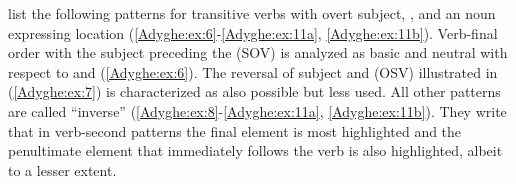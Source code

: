 \documentclass[output=paper,colorlinks,citecolor=brown, draft]{langscibook}
\begin{document}
\citet[91]{jakovlev1941grammatika} list the following patterns for transitive verbs with overt subject, , and an  noun expressing location (\ref{Adyghe:ex:6}-\ref{Adyghe:ex:11a}, \ref{Adyghe:ex:11b}). Verb-final order with the subject preceding the  (SOV) is analyzed as basic and neutral with respect to  and  (\ref{Adyghe:ex:6}). The reversal of subject and  (OSV) illustrated in (\ref{Adyghe:ex:7}) is characterized as also possible but less used. All other patterns are called ``inverse'' (\ref{Adyghe:ex:8}-\ref{Adyghe:ex:11a}, \ref{Adyghe:ex:11b}). They write that in verb-second patterns the final element is most highlighted and the penultimate element that immediately follows the verb is also highlighted, albeit to a lesser extent.
\end{document}
